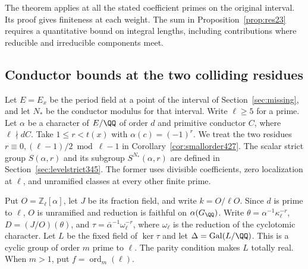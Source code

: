 \documentclass[a4paper,11pt]{article}
\theoremstyle{definition}
\theoremstyle{remark}
\newcommand{\ZZ}{\mathbb Z}\newcommand{\ord}{\operatorname{ord}}
\numberwithin{equation}{section}
\begin{document}
The theorem applies at all the stated coefficient primes on
the original interval. Its proof gives finiteness at each
weight. The sum in Proposition~\ref{prop:res23} requires a
quantitative bound on integral lengths, including contributions
where reducible and irreducible components meet.


\subsection{Conductor bounds at the two colliding residues}
\label{sec:collisionconductors457}

Let \(E=E_x\) be the period field at a point of the interval of
Section~\ref{sec:missing}, and let \(N_*\) be the conductor modulus
for that interval. Write \(\ell\ge5\) for a prime. Let \(\alpha\) be a
character of \(E/\QQ\) of order \(d\) and primitive conductor \(C\),
where \(\ell\nmid dC\). Take \(1\le r<t(x)\) with
\(\alpha(c)=(-1)^r\). We treat the two residues
\(r\equiv0,(\ell-1)/2\bmod{\ell-1}\) in
Corollary~\ref{cor:smallorder427}.
The scalar strict group \(S(\alpha,r)\) and its subgroup
\(S^{N_*}(\alpha,r)\) are defined in Section~\ref{sec:levelstrict345}.
The former uses divisible coefficients, zero localization at \(\ell\),
and unramified classes at every other finite prime.

Put \(O=\ZZ_\ell[\alpha]\), let \(J\) be its fraction field,
and write \(k=O/\ell O\). Since \(d\) is prime to \(\ell\), \(O\)
is unramified and reduction is faithful on \(\alpha(G_{\QQ})\).
Write \(\theta=\alpha^{-1}\kappa_\ell^{-r}\),
\(D=(J/O)(\theta)\), and \(\tau=\bar\alpha^{-1}\omega_\ell^{-r}\),
where \(\omega_\ell\) is the reduction of the cyclotomic character.
Let \(L\) be the fixed field of \(\ker\tau\) and let
\(\Delta=\operatorname{Gal}(L/\QQ)\). This is a cyclic group of
order \(m\) prime to \(\ell\). The parity condition makes \(L\)
totally real. When \(m>1\), put \(f=\operatorname{ord}_m(\ell)\).
\end{document}
